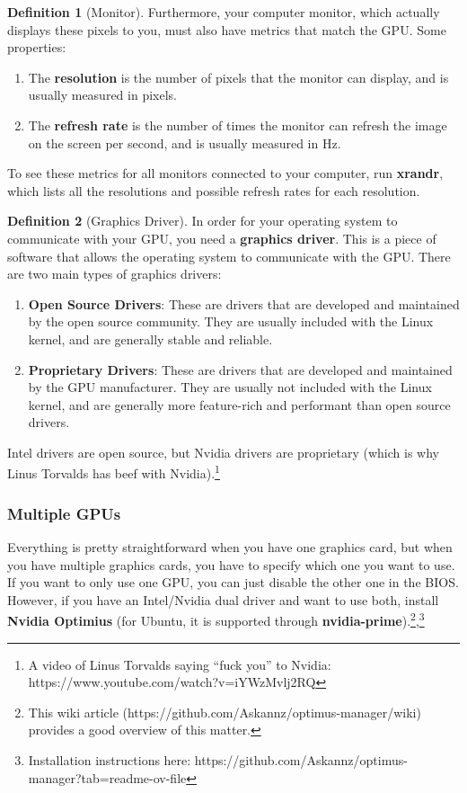 \documentclass{article}
\theoremstyle{definition}
\newtheorem{definition}{Definition}[section]
\begin{document}
    \begin{definition}[Monitor]
      Furthermore, your computer monitor, which actually displays these pixels to you, must also have metrics that match the GPU. Some properties: 
      \begin{enumerate} 
        \item The \textbf{resolution} is the number of pixels that the monitor can display, and is usually measured in pixels. 
        \item The \textbf{refresh rate} is the number of times the monitor can refresh the image on the screen per second, and is usually measured in Hz. 
      \end{enumerate}
      To see these metrics for all monitors connected to your computer, run \textbf{xrandr}, which lists all the resolutions and possible refresh rates for each resolution. 
    \end{definition}

    \begin{definition}[Graphics Driver]
      In order for your operating system to communicate with your GPU, you need a \textbf{graphics driver}. This is a piece of software that allows the operating system to communicate with the GPU. There are two main types of graphics drivers:
      \begin{enumerate} 
        \item \textbf{Open Source Drivers}: These are drivers that are developed and maintained by the open source community. They are usually included with the Linux kernel, and are generally stable and reliable. 
        \item \textbf{Proprietary Drivers}: These are drivers that are developed and maintained by the GPU manufacturer. They are usually not included with the Linux kernel, and are generally more feature-rich and performant than open source drivers. 
      \end{enumerate}
    Intel drivers are open source, but Nvidia drivers are proprietary (which is why Linus Torvalds has beef with Nvidia).\footnote{A video of Linus Torvalds saying ``fuck you'' to Nvidia: https://www.youtube.com/watch?v=iYWzMvlj2RQ}
    \end{definition}

    \subsubsection{Multiple GPUs} 

      Everything is pretty straightforward when you have one graphics card, but when you have multiple graphics cards, you have to specify which one you want to use. If you want to only use one GPU, you can just disable the other one in the BIOS. However, if you have an Intel/Nvidia dual driver and want to use both, install \textbf{Nvidia Optimius} (for Ubuntu, it is supported through \textbf{nvidia-prime}).\footnote{This wiki article (https://github.com/Askannz/optimus-manager/wiki) provides a good overview of this matter. },\footnote{Installation instructions here: https://github.com/Askannz/optimus-manager?tab=readme-ov-file} 
\end{document}
